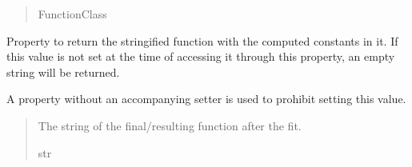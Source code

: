 \documentclass[letterpaper,10pt,english]{sphinxmanual}
\begin{document}
\begin{fulllineitems}
\begin{fulllineitems}
\begin{quote}
\begin{description}
\sphinxAtStartPar
FunctionClass

\end{description}\end{quote}

\end{fulllineitems}


\begin{fulllineitems}
\label{\detokenize{VPCModel:src.VPCModel.VPCModel.resulting_function}}
\pysigstartsignatures
{}
\pysigstopsignatures
\sphinxAtStartPar
Property to return the stringified function with the computed constants in it.
If this value is not set at the time of accessing it through this property,
an empty string will be returned.

\sphinxAtStartPar
A property without an accompanying setter is used to prohibit setting this value.
\begin{quote}\begin{description}
\sphinxAtStartPar
The string of the final/resulting function after the fit.

\sphinxAtStartPar
str

\end{description}\end{quote}

\end{fulllineitems}



\end{fulllineitems}
\end{document}

